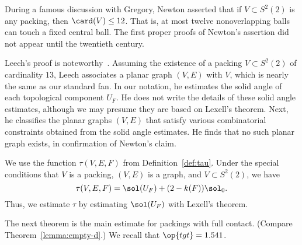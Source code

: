\begin{remark}
During a famous discussion with Gregory, Newton asserted that 
if $V\subset S^2(2)$ is any packing, then $\card(V)\le 12$. That is, at most
twelve nonoverlapping balls can touch a fixed central ball.  The first proper
proofs of Newton's assertion did not appear until the twentieth century.
%
%
%
%
  
 Leech's proof is
noteworthy~\cite{Leech:1956:MG}.  Assuming the existence of a packing
$V\subset S^2(2)$ of cardinality $13$, Leech associates a planar graph
$(V,E)$ with $V$, which is nearly the same as our standard fan.  In
our notation, he estimates the solid angle of each topological
component $U_F$.  He does not write the details of these solid angle
estimates, although we may presume they are based on Lexell's theorem.
Next, he classifies the planar graphs $(V,E)$ that satisfy various
combinatorial constraints obtained from the solid angle estimates. He
finds that no such planar graph exists, in confirmation of Newton's
claim.
\end{remark}

We use the function $\tau(V,E,F)$ from Definition~\ref{def:tau}.  Under the 
special conditions that 
$V$ is a packing, $(V,E)$ is a  graph, and
$V\subset S^2(2)$, we have 
\[
\tau(V,E,F) = \sol(U_F) + (2-k(F)) \sol_0.
\]
Thus, we estimate $\tau$ by estimating $\sol(U_F)$ with Lexell's theorem.



The next theorem is the main estimate for packings with full contact.
(Compare  Theorem~\ref{lemma:empty-d}.)  
We recall that $\op{tgt}=1.541$.
%
%


